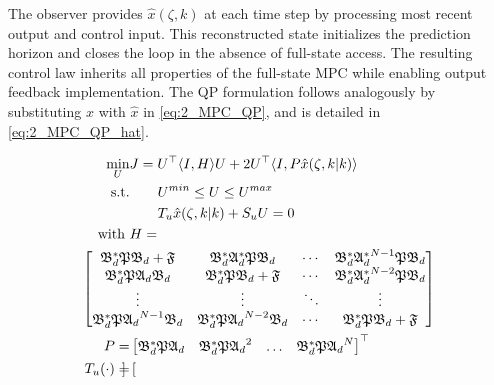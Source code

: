 The observer provides ${\hat{x}}(\zeta,k)$ at each time step by processing most recent output and control input. This reconstructed state initializes the prediction horizon and closes the loop in the absence of full-state access. The resulting control law inherits all properties of the full-state MPC while enabling output feedback implementation. The QP formulation follows analogously by substituting ${x}$ with ${\hat{x}}$ in \eqref{eq:2_MPC_QP}, and is detailed in \eqref{eq:2_MPC_QP_hat}.

\begin{equation} \label{eq:2_MPC_QP_hat}
    \begin{aligned}
        \min_{U} &J = U^\top \langle I,H \rangle U + 2U^\top \langle I, P {\hat{x}}(\zeta, k|k) \rangle \\
        \text{s.t.} &\qquad U^{min} \leq U \leq U^{max} \\
        &\qquad T_u {\hat{x}}(\zeta, k|k) + S_u U = 0
        \, \\
        \text{with } &H = \\
        &\hspace{-3.5em }\begin{bmatrix}
            \mathfrak{B}_d^* \mathfrak{P} \mathfrak{B}_d + \mathfrak{F} & \mathfrak{B}_d^* \mathfrak{A}_d^* \mathfrak{P} \mathfrak{B}_d & \cdots &  \mathfrak{B}_d^* {\mathfrak{A}_d^*}^{N-1} \mathfrak{P} \mathfrak{B}_d \\
            \mathfrak{B}_d^* \mathfrak{P} \mathfrak{A}_d \mathfrak{B}_d & \mathfrak{B}_d^* \mathfrak{P} \mathfrak{B}_d + \mathfrak{F} & \cdots & \mathfrak{B}_d^* {\mathfrak{A}_d^*}^{N-2} \mathfrak{P} \mathfrak{B}_d \\
            \vdots & \vdots & \ddots & \vdots \\
            \mathfrak{B}_d^* \mathfrak{P} {\mathfrak{A}_d}^{N-1} \mathfrak{B}_d & \mathfrak{B}_d^* \mathfrak{P} {\mathfrak{A}_d}^{N-2} \mathfrak{B}_d & \cdots & \mathfrak{B}_d^* \mathfrak{P} \mathfrak{B}_d + \mathfrak{F}
        \end{bmatrix} \\
        P = &\begin{bmatrix}
            \mathfrak{B}_d^* \mathfrak{P} {\mathfrak{A}_d} &
            \mathfrak{B}_d^* \mathfrak{P} {\mathfrak{A}_d}^{2}  &
            \hdots &
            \mathfrak{B}_d^* \mathfrak{P} {\mathfrak{A}_d}^{N} 
        \end{bmatrix}^\top \\
        T_u (\cdot) = &\begin{bmatrix}

\end{bmatrix}
\end{aligned}
\end{equation}
